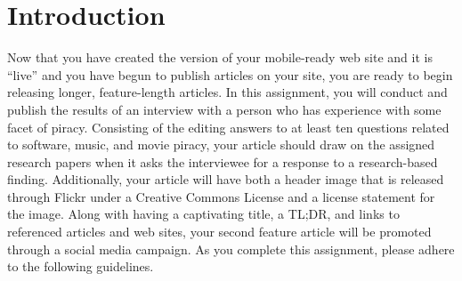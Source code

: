 

\usepackage[compact]{titlesec}




\vspace*{-.2in}
\section*{Introduction}

Now that you have created the version of your mobile-ready web site and it is ``live'' and you have begun to publish
articles on your site, you are ready to begin releasing longer, feature-length articles. In this assignment, you will
conduct and publish the results of an interview with a person who has experience with some facet of piracy. Consisting
of the editing answers to at least ten questions related to software, music, and movie piracy, your article should draw
on the assigned research papers when it asks the interviewee for a response to a research-based finding. Additionally,
your article will have both a header image that is released through Flickr under a Creative Commons License and a
license statement for the image. Along with having a captivating title, a TL;DR, and links to referenced articles and
web sites, your second feature article will be promoted through a social media campaign. As you complete this
assignment, please adhere to the following guidelines.

